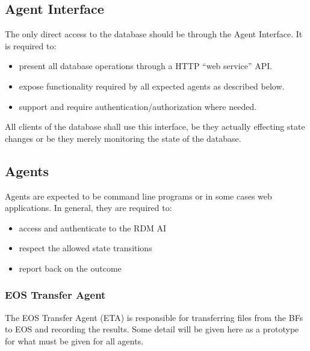 \documentclass[pdftex,12pt,letter]{article}
\begin{document}
\subsection{Agent Interface}

The only direct access to the database should be through the Agent
Interface.  It is required to:
\begin{itemize}
\item present all database operations through a HTTP ``web service'' API.
\item expose functionality required by all expected agents as described below.
\item support and require authentication/authorization where needed.
\end{itemize}

All clients of the database shall use this interface, be they actually
effecting state changes or be they merely monitoring the state of the
database.

\subsection{Agents}
\label{subsec:agents}

Agents are expected to be command line programs or in some cases web
applications.  In general, they are required to:

\begin{itemize}
\item access and authenticate to the RDM AI
\item respect the allowed state transitions
\item report back on the outcome
\end{itemize}



\subsubsection{EOS Transfer Agent}
\label{subsec:eosxferagent}

The EOS Transfer Agent (ETA) is responsible for transferring files
from the BFs to EOS and recording the results.  Some detail will be
given here as a prototype for what must be given for all agents.
\end{document}
